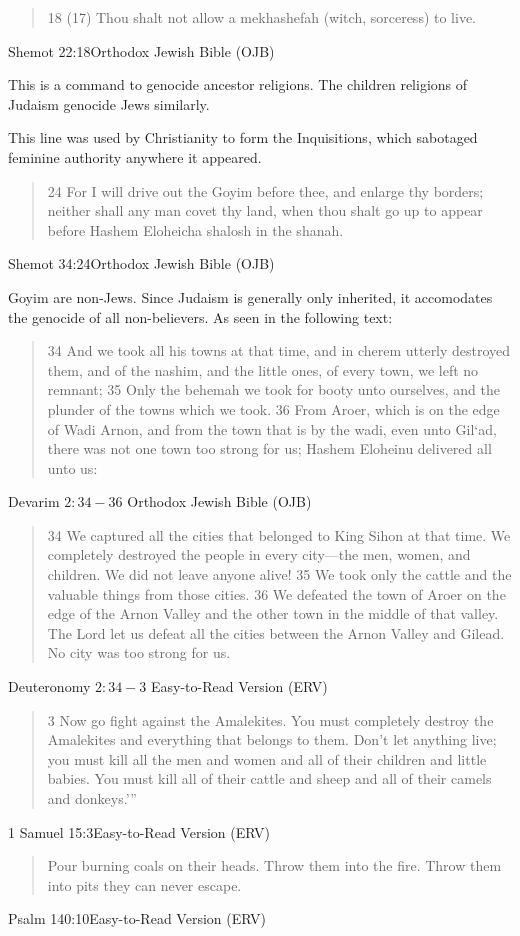\blockquote{18 (17) Thou shalt not allow a mekhashefah (witch, sorceress) to
live.}{Shemot 22:18Orthodox Jewish Bible (OJB)}

This is a command to genocide ancestor religions.
The children religions of Judaism genocide Jews similarly.

This line was used by Christianity to form the Inquisitions, which sabotaged
feminine authority anywhere it appeared. 

\blockquote{24 For I will drive out the Goyim before thee, and enlarge thy borders; 
neither shall any man covet thy land, when thou shalt go up to appear before 
Hashem Eloheicha shalosh in the shanah.
}{Shemot 34:24Orthodox Jewish Bible (OJB)}

Goyim are non-Jews.  Since Judaism is generally only inherited, it accomodates 
the genocide of all non-believers. As seen in the following text:

\blockquote{34 And we took all his towns at that time, and in cherem utterly
destroyed them, and of the nashim, and the little ones, of every town, we left
no remnant;
35 Only the behemah we took for booty unto ourselves, and the plunder of the
towns which we took.
36 From Aroer, which is on the edge of Wadi Arnon, and from the town that is by
the wadi, even unto Gil‘ad, there was not one town too strong for us; Hashem
Eloheinu delivered all unto us:
} {Devarim $2:34-36$ Orthodox Jewish Bible (OJB)}

\blockquote{34 We captured all the cities that belonged to King Sihon at that time. We
completely destroyed the people in every city—the men, women, and children. We
did not leave anyone alive! 35 We took only the cattle and the valuable things
from those cities. 36 We defeated the town of Aroer on the edge of the Arnon
Valley and the other town in the middle of that valley. The Lord let us defeat
all the cities between the Arnon Valley and Gilead. No city was too strong for
us. 
}{Deuteronomy $2:34-3$ Easy-to-Read Version (ERV)}

\blockquote{3 Now go fight against the Amalekites. You must completely destroy the
Amalekites and everything that belongs to them. Don’t let anything live; you
must kill all the men and women and all of their children and little babies. You
must kill all of their cattle and sheep and all of their camels and donkeys.’”}
{1 Samuel 15:3Easy-to-Read Version (ERV)}

\blockquote{Pour burning coals on their heads.
    Throw them into the fire.
    Throw them into pits they can never escape.
}{Psalm 140:10Easy-to-Read Version (ERV)}

